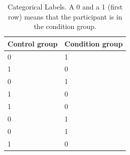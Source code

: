 \begin{table}
  \begin{center}
    \begin{tabular}{| l | l |}
      \hline
      \textbf{Control group} & \textbf{Condition group}  \\ \hline
      0                    &  1                \\ \hline
      1                    &  0                \\ \hline
      0                    &  1                \\ \hline
      1                    &  0                \\ \hline
      1                    &  0                \\ \hline
      0                    &  1                \\ \hline
      0                    &  1                \\ \hline
      1                    &  0                \\ \hline
    \end{tabular}
    \caption{Categorical Labels. A 0 and a 1 (first row) means that the participant is in the condition group.}
    \label{table:categorical_labels}
  \end{center}
\end{table}

